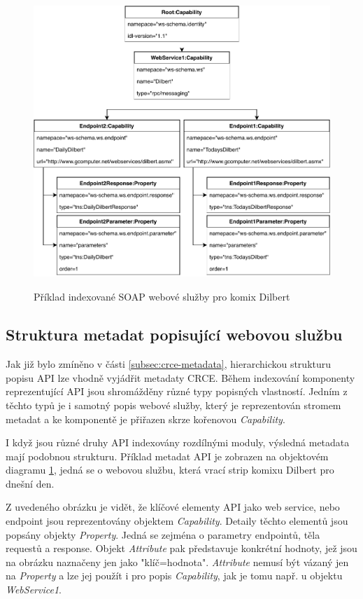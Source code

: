 \documentclass[czech,DP]{thesiskiv}
\begin{document}
\begin{figure}[h]
	\centering
	\includegraphics[height=11cm]{indexed-api-example}
	\caption{Příklad indexované SOAP webové služby pro komix Dilbert }
	\label{fig:indexed-api-example}
\end{figure}

\subsection{Struktura metadat popisující webovou službu}

Jak již bylo zmíněno v části \ref{subsec:crce-metadata}, hierarchickou strukturu popisu API lze vhodně vyjádřit metadaty CRCE. Během indexování komponenty reprezentující API jsou shromážděny různé typy popisných vlastností. Jedním z těchto typů je i samotný popis webové služby, který je reprezentován stromem metadat a ke komponentě je přiřazen skrze  kořenovou \textit{Capability}.   

I když jsou různé druhy API indexovány rozdílnými moduly, výsledná metadata mají podobnou strukturu. Příklad metadat API je zobrazen na objektovém diagramu \ref{fig:indexed-api-example}, jedná se o webovou službu, která vrací strip komixu Dilbert pro dnešní den.

Z uvedeného obrázku je vidět, že klíčové elementy API jako web service, nebo endpoint jsou reprezentovány objektem \textit{Capability}. Detaily těchto elementů jsou popsány objekty \textit{Property}. Jedná se zejména o parametry endpointů, těla requestů a response. Objekt \textit{Attribute} pak představuje konkrétní hodnoty, jež jsou na obrázku naznačeny jen jako "klíč=hodnota". \textit{Attribute} nemusí být vázaný jen na \textit{Property} a lze jej použít i pro popis \textit{Capability}, jak je tomu např. u objektu \textit{WebService1}.
\end{document}
